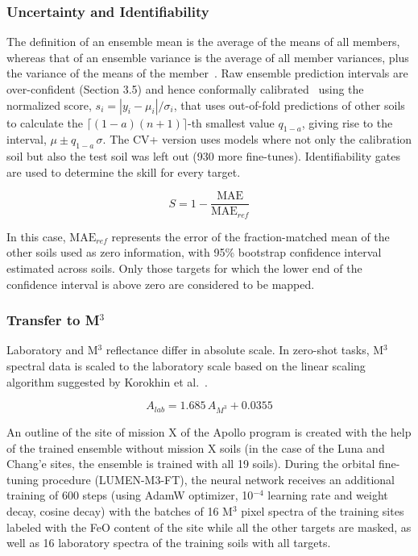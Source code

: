 \documentclass[remotesensing,article,submit,pdftex,moreauthors]{Definitions/mdpi}
\begin{document}
\subsubsection{Uncertainty and Identifiability}

The definition of an ensemble mean is the average of the means of all members, whereas that of an ensemble variance is the average of all member variances, plus the variance of the means of the member~\cite{lakshminarayanan2017}. Raw ensemble prediction intervals are over-confident (Section 3.5) and hence conformally calibrated~\cite{barber2021} using the normalized score, $s_i = |y_i - \mu_i|/\sigma_i$, that uses out-of-fold predictions of other soils to calculate the $\lceil (1-a)(n+1)\rceil$-th smallest value $q_{1-a}$, giving rise to the interval, $\mu \pm q_{1-a}\,\sigma$. The CV+ version uses models where not only the calibration soil but also the test soil was left out (930 more fine-tunes). Identifiability gates are used to determine the skill for every target.

\begin{equation}
S = 1 - \frac{\mathrm{MAE}}{\mathrm{MAE}_{ref}}
\label{eq9}
\end{equation}

In this case, $\mathrm{MAE}_{ref}$ represents the error of the fraction-matched mean of the other soils used as zero information, with 95\% bootstrap confidence interval estimated across soils. Only those targets for which the lower end of the confidence interval is above zero are considered to be mapped.

\subsubsection{Transfer to M$^{3}$}

Laboratory and M$^{3}$ reflectance differ in absolute scale. In zero-shot tasks, M$^{3}$ spectral data is scaled to the laboratory scale based on the linear scaling algorithm suggested by Korokhin et al.~\cite{korokhin2024}.

\begin{equation}
A_{lab} = 1.685\,A_{M^3} + 0.0355
\label{eq10}
\end{equation}

An outline of the site of mission X of the Apollo program is created with the help of the trained ensemble without mission X soils (in the case of the Luna and Chang'e sites, the ensemble is trained with all 19 soils). During the orbital fine-tuning procedure (LUMEN-M3-FT), the neural network receives an additional training of 600 steps (using AdamW optimizer, 10$^{-4}$ learning rate and weight decay, cosine decay) with the batches of 16 M$^{3}$ pixel spectra of the training sites labeled with the FeO content of the site while all the other targets are masked, as well as 16 laboratory spectra of the training soils with all targets.
\end{document}
